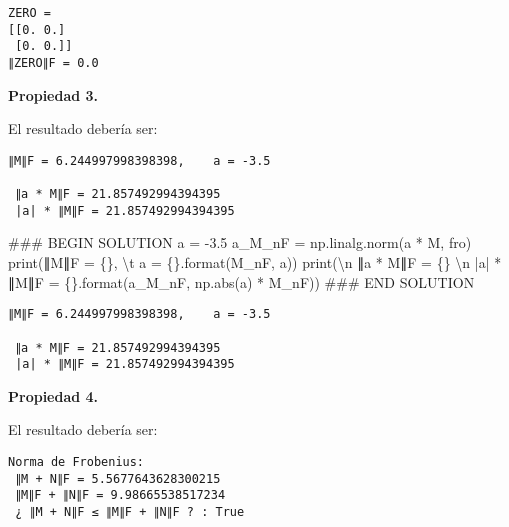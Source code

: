 \documentclass[
  letterpaper,
  DIV=11,
  numbers=noendperiod]{scrreprt}
\newenvironment{Shaded}{\begin{snugshade}}{\end{snugshade}}
\newcommand{\BuiltInTok}[1]{\textcolor[rgb]{0.00,0.23,0.31}{#1}}
\newcommand{\CharTok}[1]{\textcolor[rgb]{0.13,0.47,0.30}{#1}}
\newcommand{\CommentTok}[1]{\textcolor[rgb]{0.37,0.37,0.37}{#1}}
\newcommand{\FloatTok}[1]{\textcolor[rgb]{0.68,0.00,0.00}{#1}}
\newcommand{\NormalTok}[1]{\textcolor[rgb]{0.00,0.23,0.31}{#1}}
\newcommand{\OperatorTok}[1]{\textcolor[rgb]{0.37,0.37,0.37}{#1}}
\newcommand{\RegionMarkerTok}[1]{\textcolor[rgb]{0.00,0.23,0.31}{#1}}
\newcommand{\SpecialCharTok}[1]{\textcolor[rgb]{0.37,0.37,0.37}{#1}}
\newcommand{\StringTok}[1]{\textcolor[rgb]{0.13,0.47,0.30}{#1}}
\begin{document}
\begin{verbatim}
ZERO = 
[[0. 0.]
 [0. 0.]]
∥ZERO∥F = 0.0
\end{verbatim}

\textbf{Propiedad 3.}

El resultado debería ser:

\begin{verbatim}
∥M∥F = 6.244997998398398,    a = -3.5

 ∥a * M∥F = 21.857492994394395 
 |a| * ∥M∥F = 21.857492994394395
\end{verbatim}

\begin{Shaded}
\begin{Highlighting}[]
\CommentTok{\#\#\# }\RegionMarkerTok{BEGIN}\CommentTok{ SOLUTION}
\NormalTok{a }\OperatorTok{=} \OperatorTok{{-}}\FloatTok{3.5}
\NormalTok{a\_M\_nF }\OperatorTok{=}\NormalTok{ np.linalg.norm(a }\OperatorTok{*}\NormalTok{ M, }\StringTok{\textquotesingle{}fro\textquotesingle{}}\NormalTok{) }
\BuiltInTok{print}\NormalTok{(}\StringTok{\textquotesingle{}∥M∥F = }\SpecialCharTok{\{\}}\StringTok{, }\CharTok{\textbackslash{}t}\StringTok{ a = }\SpecialCharTok{\{\}}\StringTok{\textquotesingle{}}\NormalTok{.}\BuiltInTok{format}\NormalTok{(M\_nF, a))}
\BuiltInTok{print}\NormalTok{(}\StringTok{\textquotesingle{}}\CharTok{\textbackslash{}n}\StringTok{ ∥a * M∥F = }\SpecialCharTok{\{\}}\StringTok{ }\CharTok{\textbackslash{}n}\StringTok{ |a| * ∥M∥F = }\SpecialCharTok{\{\}}\StringTok{\textquotesingle{}}\NormalTok{.}\BuiltInTok{format}\NormalTok{(a\_M\_nF, np.}\BuiltInTok{abs}\NormalTok{(a) }\OperatorTok{*}\NormalTok{ M\_nF))}
\CommentTok{\#\#\# }\RegionMarkerTok{END}\CommentTok{ SOLUTION}
\end{Highlighting}
\end{Shaded}

\begin{verbatim}
∥M∥F = 6.244997998398398,    a = -3.5

 ∥a * M∥F = 21.857492994394395 
 |a| * ∥M∥F = 21.857492994394395
\end{verbatim}

\textbf{Propiedad 4.}

El resultado debería ser:

\begin{verbatim}
Norma de Frobenius:
 ∥M + N∥F = 5.5677643628300215
 ∥M∥F + ∥N∥F = 9.98665538517234
 ¿ ∥M + N∥F ≤ ∥M∥F + ∥N∥F ? : True
\end{verbatim}
\end{document}
